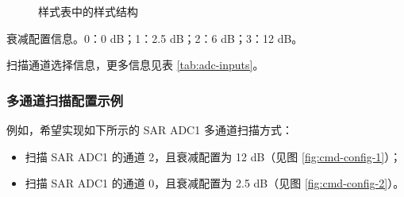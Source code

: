 \documentclass[main\_\_CN.tex]{subfiles}
\begin{document}
\begin{figure}[H]
\centering
{}%
%
\end{figure}
\vspace{-2em}
\begin{figure}[H]
    \centering
    \caption{样式表中的样式结构}
    \label{tab:pattern-table-register}
\end{figure}
\vspace{-2em}
\begin{regdesc}\begin{reglist}
\item [atten] 衰减配置信息。0：0 dB；1：2.5 dB；2：6 dB；3：12 dB。
\item [ch\_sel] 扫描通道选择信息，更多信息见表 \ref{tab:adc-inputs}。
\end{reglist}\end{regdesc}


\subsubsection{多通道扫描配置示例}

例如，希望实现如下所示的 SAR ADC1 多通道扫描方式：
\begin{itemize}
    \item 扫描 SAR ADC1 的通道 2，且衰减配置为 12 dB（见图 \ref{fig:cmd-config-1}）；
    \item 扫描 SAR ADC1 的通道 0，且衰减配置为 2.5 dB（见图 \ref{fig:cmd-config-2}）。
\end{itemize}
\end{document}
